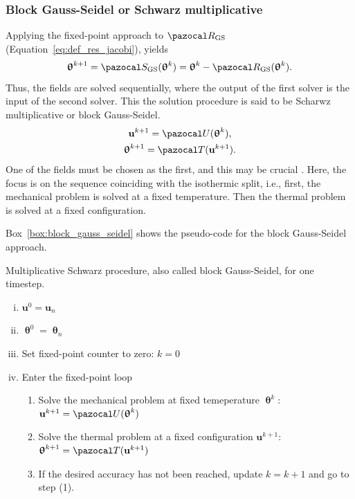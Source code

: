 \subsubsection{Block Gauss-Seidel or Schwarz multiplicative}

Applying the fixed-point approach to \(\pazocal R_\mathrm{GS}\) (Equation~\eqref{eq:def_res_jacobi}), yields
\begin{equation}
  \bm\uptheta^{k+1} = \pazocal S_\mathrm{GS}(\bm\uptheta^k) =  \bm\uptheta^k - \pazocal R_\mathrm{GS}(\bm \uptheta^k).
\end{equation}
Thus, the fields are solved sequentially, where the output of the first solver is the input of the second solver.
This the solution procedure is said to be Scharwz multiplicative or block Gauss-Seidel.
\begin{gather}
\mathbf u^{k+1}  = \pazocal U(\bm \uptheta^k),\\
\bm \uptheta^{k+1} = \pazocal T(\mathbf u^{k+1}).
\end{gather}
One of the fields must be chosen as the first, and this may be crucial \citep{joosten_analysis_2009}.
Here, the focus is on the sequence coinciding with the isothermic split, i.e., first, the mechanical problem is solved at a fixed temperature.
Then the thermal problem is solved at a fixed configuration.

Box~\ref{box:block_gauss_seidel} shows the pseudo-code for the block Gauss-Seidel approach.

\begin{framedbox}[htb]
  \caption{Multiplicative Schwarz procedure, also called block Gauss-Seidel, for one timestep.}
  \label{box:block_gauss_seidel}
  \begin{center}
    \begin{minipage}{0.9\textwidth}
    \begin{enumerate}[(i)]
    \item \(\mathbf u^0 = \mathbf u_{n}\)
    \item \(\bm \uptheta^0 = \bm \uptheta_n\)
      \item Set fixed-point counter to zero: \(k=0\)
    \item Enter the fixed-point loop
    \begin{enumerate}[(1)]
      \item Solve the mechanical problem at fixed temeperature \(\bm \uptheta^k\): \(\mathbf u^{k+1} = \pazocal U(\bm \uptheta^k)\)
      \item Solve the thermal problem at a fixed configuration \(\mathbf u^{k+1}\): \(\bm \uptheta^{k+1} = \pazocal T(\mathbf u^{k+1})\)
      \item If the desired accuracy has not been reached, update \(k=k+1\) and go to step (1).

    \end{enumerate}
    \end{enumerate}
    \end{minipage}
  \end{center}
\end{framedbox}

